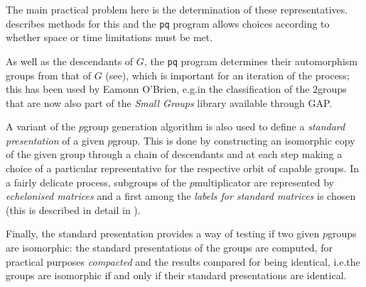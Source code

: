 \documentclass[a4paper,11pt]{report}
\begin{document}
{{ The main practical problem here is the determination of these representatives. \cite{OBr90} describes methods for this and the \texttt{pq} program allows choices according to whether space or time limitations must be
met. 

 As well as the descendants of $G$, the \texttt{pq} program determines their automorphism groups from that of $G$ (see{\nobreakspace}\cite{OBr95}), which is important for an iteration of the process; this has been used by
Eamonn O'Brien, e.g.{\nobreakspace}in the classification of the $2$\texttt{}groups that are now also part of the \emph{Small Groups} library available through \textsf{GAP}. 

   A variant of the $p$\texttt{}group generation algorithm is also used to define a \emph{standard presentation} of a given $p$\texttt{}group. This is done by constructing an isomorphic copy of
the given group through a chain of descendants and at each step making a
choice of a particular representative for the respective orbit of capable
groups. In a fairly delicate process, subgroups of the $p$\texttt{}multiplicator are represented by \emph{echelonised matrices} and a first among the \emph{labels for standard matrices} is chosen (this is described in detail in \cite{OBr94}). 

  Finally, the standard presentation provides a way of testing if two given $p$\texttt{}groups are isomorphic: the standard presentations of the
groups are computed, for practical purposes \emph{compacted} and the results compared for being identical, i.e.{\nobreakspace}the groups
are isomorphic if and only if their standard presentations are identical. }

 }

 
\end{document}
